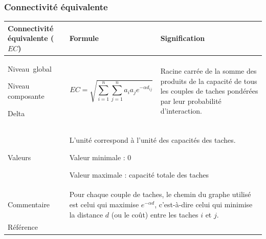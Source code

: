 \documentclass{article}
\begin{document}
\subsubsection{Connectivité équivalente}
\label{metric_EC}
\begin{table}[H]
	\begin{tabular}{|m{3.24cm}|m{4.4810004cm}m{7.924cm}|}
		
		\hline
		Connectivité équivalente ($EC$) &
		\multicolumn{1}{m{4.4810004cm}|}{Formule} &
		Signification\\\hline
		Niveau~global
		
		Niveau composante
		
		Delta &
		\multicolumn{1}{m{4.4810004cm}|}{\begin{equation*}
			\mathit{EC}=\sqrt{\sum _{i=1}^{n}{\sum _{j=1}^{n}{{a}_{i}}}{{a}_{j}e}^{-\alpha {d}_{\mathit{ij}}}}
			\end{equation*}
		} &
		Racine carrée de la somme des produits de la capacité de tous les couples de taches pondérées par leur probabilité d’interaction.
		
		\\\hline
		Valeurs &
		\multicolumn{2}{m{12.6050005cm}|}{
			L'unité correspond à l'unité des capacités des taches.
			
			Valeur minimale : 0
			
			Valeur maximale : capacité totale des taches
		}\\\hline
		Commentaire &
		\multicolumn{2}{m{12.6050005cm}|}{Pour chaque couple de taches, le chemin du graphe utilisé est celui qui maximise  ${e}^{-\mathit{\alpha d}}$, c’est-à-dire celui qui minimise la distance $d$ (ou le coût) entre les taches $i$ et $j$.
			
		}\\\hline
		Référence &
		\multicolumn{2}{m{12.6050005cm}|}{\cite{Saura2011}}\\\hline
	\end{tabular}
\end{table}
\end{document}
